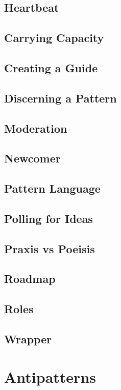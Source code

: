 \documentclass[ebook, 12pt, twoside]{memoir}
\begin{document}
\section*{Heartbeat}

\section*{Carrying Capacity}

\section*{Creating a Guide}

\section*{Discerning a Pattern}

\section*{Moderation}

\section*{Newcomer}

\section*{Pattern Language}

\section*{Polling for Ideas}

\section*{Praxis vs Poeisis}

\section*{Roadmap}

\section*{Roles}

\section*{Wrapper}


\chapter[\textbf{Antipatterns}]{Antipatterns}
\end{document}
